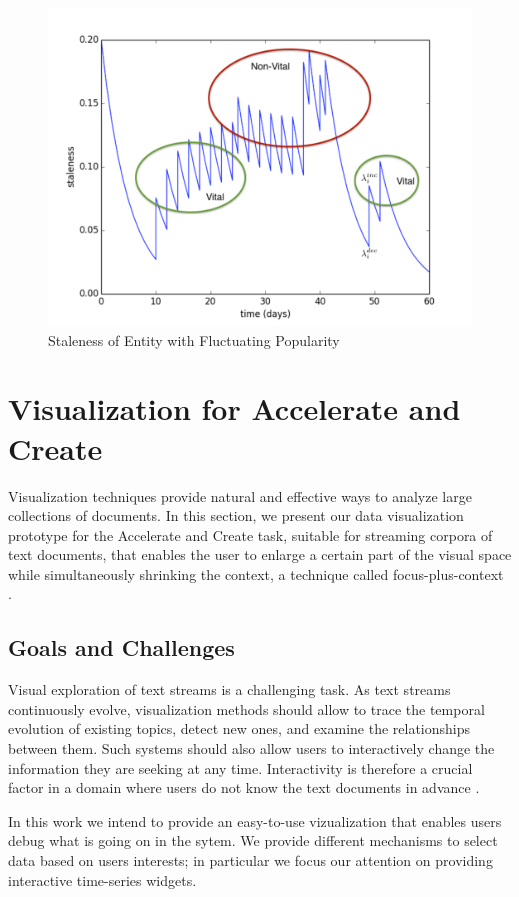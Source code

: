 \documentclass{article}
\begin{document}
\begin{figure}[tb]
\centering
\includegraphics[width=0.7\columnwidth]{fig/staleness2.pdf}
\caption{Staleness of Entity with Fluctuating Popularity}
\label{stalenessmedium}
\end{figure}

\section{Visualization for Accelerate and Create}

Visualization techniques provide natural and effective ways to analyze large collections of documents. In this section, we present our data visualization prototype for the Accelerate and Create task, suitable for streaming corpora of text documents, that enables the user to enlarge a certain part of the visual space while simultaneously shrinking the context, a technique called focus-plus-context \cite{Artur2010}.

\subsection{Goals and Challenges}

Visual exploration of text streams is a challenging task. As text streams continuously evolve, visualization methods should allow 
to trace the temporal evolution of existing topics, detect new ones, and examine the relationships between them. Such systems should also allow 
users to interactively change the information they are seeking at any time. Interactivity is therefore a crucial factor in a domain where users
do not know the text documents in advance \cite{AlsakranCLZYDL12}.

In this work we intend to provide an easy-to-use vizualization that enables users debug what is going on in the sytem. We provide different mechanisms to select data based on users interests; in particular we focus our attention on providing interactive time-series widgets.
\end{document}
